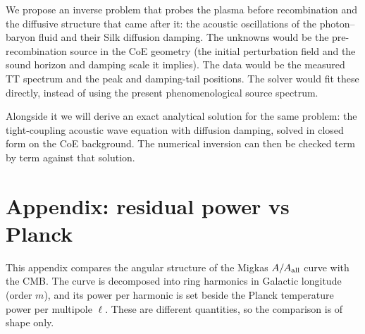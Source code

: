 \documentclass[11pt]{article}
\begin{document}
We propose an inverse problem that probes the plasma before recombination and the diffusive structure that came after it: the acoustic oscillations of the photon--baryon fluid and their Silk diffusion damping. The unknowns would be the pre-recombination source in the CoE geometry (the initial perturbation field and the sound horizon and damping scale it implies). The data would be the measured TT spectrum and the peak and damping-tail positions. The solver would fit these directly, instead of using the present phenomenological source spectrum.

Alongside it we will derive an exact analytical solution for the same problem: the tight-coupling acoustic wave equation with diffusion damping, solved in closed form on the CoE background. The numerical inversion can then be checked term by term against that solution.
\section*{Appendix: residual power vs Planck}
This appendix compares the angular structure of the Migkas $A/A_{\rm all}$ curve with the CMB. The curve is decomposed into ring harmonics in Galactic longitude (order $m$), and its power per harmonic is set beside the Planck temperature power per multipole $\ell$. These are different quantities, so the comparison is of shape only.
\end{document}
